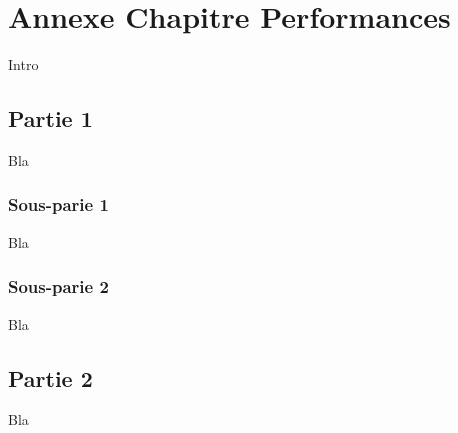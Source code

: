\chapter*{Annexe Chapitre Performances}

\setcounter{section}{0}

Intro

%
%
%

\section{Partie 1}

Bla

\subsection{Sous-parie 1}

Bla

\subsection{Sous-parie 2}

Bla

\section{Partie 2}


Bla

